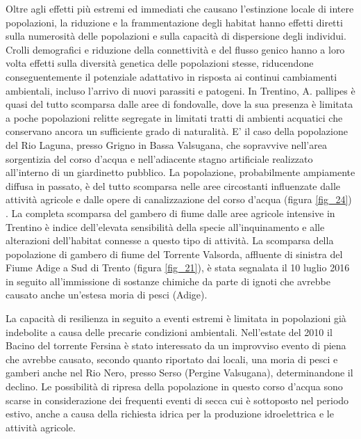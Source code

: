 \documentclass[11pt,a4paper,italian,twoside,openany]{memoir}
\begin{document}
Oltre agli effetti più estremi ed immediati che causano l'estinzione locale di intere popolazioni, la riduzione e la frammentazione degli habitat hanno effetti diretti sulla numerosità delle popolazioni e sulla capacità di dispersione degli individui. Crolli demografici e riduzione della connettività e del flusso genico hanno a loro volta effetti sulla diversità genetica delle popolazioni stesse, riducendone conseguentemente il potenziale adattativo in risposta ai continui cambiamenti ambientali, incluso l'arrivo di nuovi parassiti e patogeni.
In Trentino, A. pallipes è quasi del tutto scomparsa dalle aree di fondovalle, dove la sua presenza è limitata a poche popolazioni relitte segregate in limitati tratti di ambienti acquatici che conservano ancora un sufficiente grado di naturalità. E' il caso della popolazione del Rio Laguna, presso Grigno in Bassa Valsugana, che sopravvive nell'area sorgentizia del corso d'acqua e nell'adiacente stagno artificiale realizzato all'interno di un giardinetto pubblico. La popolazione, probabilmente ampiamente diffusa in passato, è del tutto scomparsa nelle aree circostanti influenzate dalle attività agricole e dalle opere di canalizzazione del corso d'acqua (figura \ref{fig_24}) . La completa scomparsa del gambero di fiume dalle aree agricole intensive in Trentino è indice dell'elevata sensibilità della specie all'inquinamento e alle alterazioni dell'habitat connesse a questo tipo di attività. La scomparsa della popolazione di gambero di fiume del Torrente Valsorda, affluente di sinistra del Fiume Adige a Sud di Trento (figura \ref{fig_21}), è stata segnalata il 10 luglio 2016 in seguito all'immissione di sostanze chimiche da parte di ignoti che avrebbe causato anche un'estesa moria di pesci (Adige).

La capacità di resilienza in seguito a eventi estremi è limitata in popolazioni già indebolite a causa delle precarie condizioni ambientali. Nell'estate del 2010 il Bacino del torrente Fersina è stato interessato da un improvviso evento di piena che avrebbe causato, secondo quanto riportato dai locali, una moria di pesci e gamberi anche nel Rio Nero, presso Serso (Pergine Valsugana), determinandone il declino. Le possibilità di ripresa della popolazione in questo corso d'acqua sono scarse in considerazione dei frequenti eventi di secca cui è sottoposto nel periodo estivo, anche a causa della richiesta idrica per la produzione idroelettrica e le attività agricole. 
\end{document}
